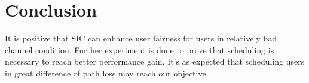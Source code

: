 \section{Conclusion}
\label{sec_conclusion}
It is positive that SIC can enhance user fairness for users in
relatively bad channel condition.
Further experiment is done to prove that scheduling is
necessary to reach better performance gain.
It's as expected that scheduling users in great difference of path
loss may reach our objective.
